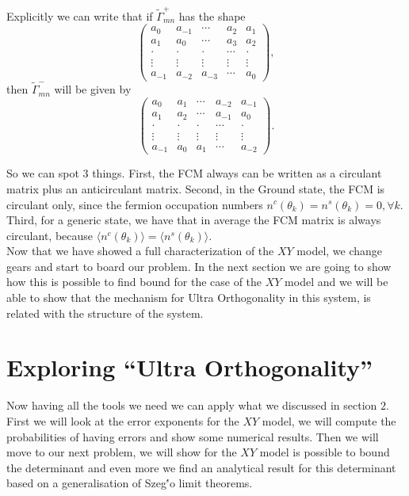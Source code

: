 Explicitly we can write that if $\tilde{\Gamma}^{+}_{mn}$ has the shape
\begin{equation}
\left(\begin{array}{ccccc}
a_{0} & a_{-1} & \cdots & a_{2} & a_{1} \\
a_{1} & a_{0} & \cdots & a_{3} & a_{2} \\
\cdot & \cdot & \cdot & \cdots & \cdot \\
\vdots & \vdots & \vdots & \vdots & \vdots \\
a_{-1} & a_{-2} & a_{-3} & \cdots & a_{0}
\end{array}\right),
\end{equation}
then $\tilde{\Gamma}^{-}_{mn}$ will be given by
\begin{equation}
\left(\begin{array}{ccccc}
a_{0} & a_{1} & \cdots & a_{-2} & a_{-1} \\
a_{1} & a_{2} & \cdots & a_{-1} & a_{0} \\
\cdot & \cdot & \cdot & \cdots & \cdot \\
\vdots & \vdots & \vdots & \vdots & \vdots \\
a_{-1} & a_{0} & a_{1} & \cdots & a_{-2}
\end{array}\right).
\end{equation}

So we can spot 3 things. First, the FCM always can be written as a circulant matrix plus an anticirculant matrix. Second, in the Ground state, the FCM is circulant only, since the fermion occupation numbers $n^{c}\left(\theta_{k}\right)=n^{s}\left(\theta_{k}\right)=0, \forall k$. Third, for a generic state, we have that in average the FCM matrix is always circulant, because $\langle n^{c}\left(\theta_{k}\right)\rangle=\langle n^{s}\left(\theta_{k}\right)\rangle$.\\
Now that we have showed a full characterization of the $XY$ model, we change gears and start to board our problem. In the next section we are going to show how this is possible to find bound for the case of the $XY$ model and we will be able to show that the mechanism for Ultra Orthogonality in this system, is related with the structure of the system.


\section{Exploring ``Ultra Orthogonality''}
Now having all the tools we need we can apply what we discussed in section $2$. First we will look at the error exponents for the $XY$ model, we will compute the probabilities of having errors and show some numerical results. Then we will move to our next problem, we will show for the $XY$ model is possible to bound the determinant and even more we find an analytical result for this determinant based on a generalisation of Szeg\''{o} limit theorems. 

